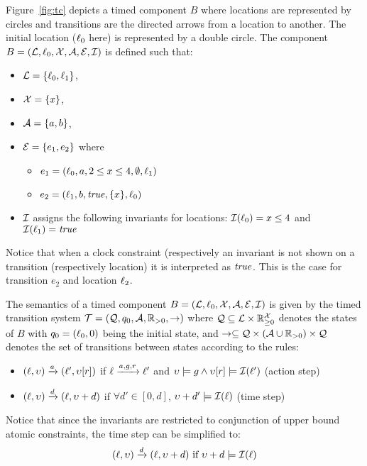 \begin{example}
  Figure~\ref{fig:tc} depicts a timed component $B$ where locations
  are represented by circles and transitions are the directed arrows
  from a location to another. The initial location ($\ell_0$ here) is
  represented by a double circle. The component 
  $B=(\mathcal{L},\ell_0,\mathcal{X},\mathcal{A},\mathcal{E},\mathcal{I})$ is defined such that:
  \begin{itemize}
    \item $\mathcal{L}=\{\ell_0,\ell_1\}$,
    \item $\mathcal{X}=\{x\}$,
    \item $\mathcal{A}=\{a,b\}$,
    \item $\mathcal{E}=\{e_1,e_2\}$ where
      \begin{itemize}
        \item $e_1=(\ell_0,a,2\le x\le4,\emptyset,\ell_1)$
        \item $e_2=(\ell_1,b,\textnormal{\textit{true}},\{x\},\ell_0)$
      \end{itemize}
    \item $\mathcal{I}$ assigns the following invariants for locations: 
      $\mathcal{I}(\ell_0)=x\le4$ and $\mathcal{I}(\ell_1)=\textnormal{\textit{true}}$
  \end{itemize}
  Notice that when a clock constraint (respectively an invariant is not
  shown on a transition (respectively location) it is interpreted as $\textnormal{\textit{true}}$.
  This is the case for transition $e_2$ and location $\ell_2$.
\end{example}


\begin{definition}
The semantics of a timed component $B=(\mathcal{L},\ell_0,\mathcal{X},\mathcal{A},\mathcal{E},\mathcal{I})$ is given by the timed transition
  system $\mathcal{T}=(\mathcal{Q},q_0,\mathcal{A},\mathbb{R}_{> 0},\to)$ where $\mathcal{Q}\subseteq\mathcal{L}\times\mathbb{R}_{\ge 0}^{\mathcal{X}}$ denotes the states
  of $B$ with $q_0=(\ell_0,0)$ being the initial state, 
  and $\to\subseteq\mathcal{Q}\times(\mathcal{A}\cup\mathbb{R}_{> 0})\times\mathcal{Q}$
  denotes the set of transitions between states according to the rules:
  \begin{itemize}
    \item $(\ell,\upsilon)\xrightarrow{a}(\ell',\upsilon[r])$ if $\ell\xrightarrow{a,g,r}
      \ell'$ and $\upsilon\models g\wedge\upsilon[r]\models\mathcal{I}(\ell')$
      (action step) 
    \item $(\ell,\upsilon)\xrightarrow{d}(\ell,\upsilon+d)$ if $\forall d'\in[0,d]$,
      $\upsilon+d'\models \mathcal{I}(\ell)$ (time step) 
  \end{itemize}
\end{definition}
Notice that since the invariants are restricted to conjunction of upper bound
atomic constraints, the time step can be simplified to:
\begin{displaymath}
  (\ell,\upsilon)\xrightarrow{d}(\ell,\upsilon+d)\text{ if }\upsilon+d\models \mathcal{I}(\ell) 
\end{displaymath}


